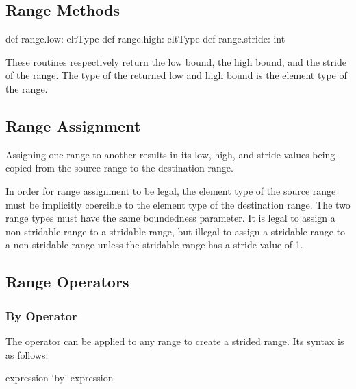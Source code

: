 \subsection{Range Methods}

\begin{protohead}
def range.low: eltType
def range.high: eltType
def range.stride: int
\end{protohead}
\begin{protobody}
These routines respectively return the low bound, the high bound, and
the stride of the range.  The type of the returned low and high bound
is the element type of the range.
\end{protobody}


\subsection{Range Assignment}
\label{Range_Assignment}

Assigning one range to another results in its low, high, and stride
values being copied from the source range to the destination range.

In order for range assignment to be legal, the element type of the
source range must be implicitly coercible to the element type of the
destination range.  The two range types must have the same boundedness
parameter.  It is legal to assign a non-stridable range to a stridable
range, but illegal to assign a stridable range to a non-stridable
range unless the stridable range has a stride value of 1.


\subsection{Range Operators}
\label{Range_Operators}

\subsubsection{By Operator}
\label{Strided_Ranges}

The  operator can be applied to any range to create a strided
range.  Its syntax is as follows:

\begin{syntax}
expression `by' expression
\end{syntax}

